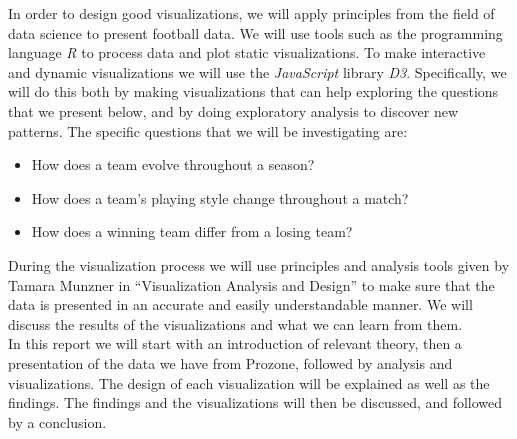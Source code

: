 \documentclass[Report.tex]{subfiles}
\begin{document}
In order to design good visualizations, we will apply principles from the field of data science to present football data. We will use tools such as the programming language \emph{R} to process data and plot static visualizations. To make interactive and dynamic visualizations we will use the \emph{JavaScript} library \emph{D3}. 
Specifically, we will do this both by making visualizations that can help exploring the questions that we present below, and by doing exploratory analysis to discover new patterns. The specific questions that we will be investigating are: 
\begin{itemize}
\item How does a team evolve throughout a season?
\item How does a team’s playing style change throughout a match?
\item How does a winning team differ from a losing team?
\end{itemize}
During the visualization process we will use principles and analysis tools given by Tamara Munzner in “Visualization Analysis and Design” to make sure that the data is presented in an accurate and easily understandable manner. We will discuss the results of the visualizations and what we can learn from them.
\\

In this report we will start with an introduction of relevant theory, then a presentation of the data we have from Prozone, followed by analysis and visualizations. The design of each visualization will be explained as well as the findings. The findings and the visualizations will then be discussed, and followed by a conclusion.
\end{document}
